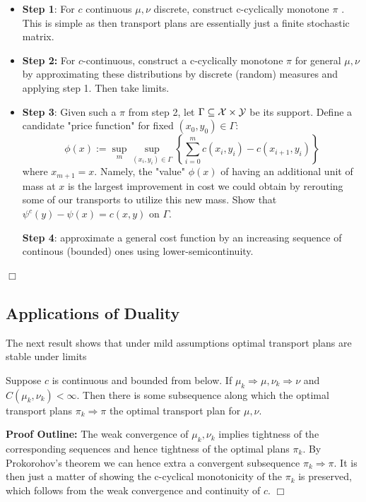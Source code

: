 \begin{itemize}
    \item \textbf{Step 1}: For $c$ continuous $\mu, \nu$ discrete, construct c-cyclically monotone $\pi$ . This is simple as then transport plans are essentially just a finite stochastic matrix.

    \item \textbf{Step 2:} For $c$-continuous, construct a c-cyclically monotone $\pi$ for general $\mu, \nu$ by approximating these distributions by discrete (random) measures and applying step 1. Then take limits.

    \item \textbf{Step 3}: Given such a $\pi$ from step 2, let $\Gamma \subseteq {\mathcal X} \times {\mathcal Y}$ be its support. Define a candidate "price function" for fixed $(x_0, y_0) \in \Gamma$:
    \[\phi(x) := \sup_m \sup_{(x_i, y_i) \in \Gamma} \left\{ \sum_{i=0}^m c(x_i, y_i) - c(x_{i+1}, y_i)\right\}\]
    \noindent where $x_{m+1} = x$. Namely, the "value" $\phi(x)$ of having an additional unit of mass at $x$ is the largest improvement in cost we could obtain by rerouting some of our transports to utilize this new mass. Show that $\psi^c(y) - \psi(x) = c(x,y)$ on $\Gamma$.

    \noindent \textbf{Step 4}: approximate a general cost function by an increasing sequence of continous (bounded) ones using lower-semicontinuity. 
\end{itemize}

$\Box$

\noindent \subsection{Applications of Duality}

\noindent The next result shows that under mild assumptions optimal transport plans are stable under limits
\begin{thm}[Stability]
    Suppose $c$ is continuous and bounded from below. If $\mu_k \Rightarrow \mu, \nu_k \Rightarrow \nu$ and $C(\mu_k, \nu_k) < \infty$. Then there is some subsequence along which the optimal transport plans $\pi_k \Rightarrow \pi$ the optimal transport plan for $\mu, \nu$.
\end{thm}

\noindent \textbf{Proof Outline: } The weak convergence of $\mu_k, \nu_k$ implies tightness of the corresponding sequences and hence tightness of the optimal plans $\pi_k$. By Prokorohov's theorem we can hence extra a convergent subsequence $\pi_k \Rightarrow \pi$. It is then just a matter of showing the c-cyclical monotonicity of the $\pi_k$ is preserved, which follows from the weak convergence and continuity of $c$. $\Box$\\

